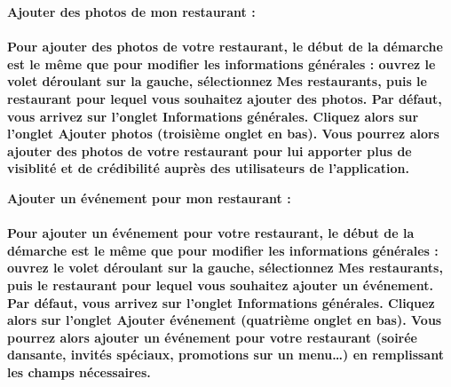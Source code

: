 \begin{description}
    \item \bf{Ajouter des photos de mon restaurant :} \\ \\
    Pour ajouter des photos de votre restaurant, le début de la démarche est le même que pour modifier les informations générales : ouvrez le volet déroulant sur la gauche, sélectionnez \og{}Mes restaurants\fg{}, puis le restaurant pour lequel vous souhaitez ajouter des photos. Par défaut, vous arrivez sur l'onglet \og{}Informations générales\fg{}. Cliquez alors sur l’onglet \og{}Ajouter photos\fg{} (troisième onglet en bas). Vous pourrez alors ajouter des photos de votre restaurant pour lui apporter plus de visiblité et de crédibilité auprès des utilisateurs de l'application. \\

    \item \bf{Ajouter un événement pour mon restaurant :} \\ \\
    Pour ajouter un événement pour votre restaurant, le début de la démarche est le même que pour modifier les informations générales : ouvrez le volet déroulant sur la gauche, sélectionnez \og{}Mes restaurants\fg{}, puis le restaurant pour lequel vous souhaitez ajouter un événement. Par défaut, vous arrivez sur l'onglet \og{}Informations générales\fg{}. Cliquez alors sur l'onglet \og{}Ajouter événement\fg{} (quatrième onglet en bas). Vous pourrez alors ajouter un événement pour votre restaurant (soirée dansante, invités spéciaux, promotions sur un menu\dots) en remplissant les champs nécessaires. \\
    
\end{description}